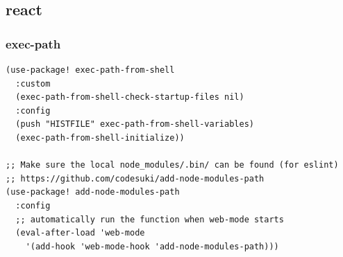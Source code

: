 \documentclass[11pt]{article}
\begin{document}
\subsection{react}
\label{sec:org29caf84}
\subsubsection{exec-path}
\label{sec:orgfc506ff}
\begin{verbatim}
(use-package! exec-path-from-shell
  :custom
  (exec-path-from-shell-check-startup-files nil)
  :config
  (push "HISTFILE" exec-path-from-shell-variables)
  (exec-path-from-shell-initialize))

;; Make sure the local node_modules/.bin/ can be found (for eslint)
;; https://github.com/codesuki/add-node-modules-path
(use-package! add-node-modules-path
  :config
  ;; automatically run the function when web-mode starts
  (eval-after-load 'web-mode
    '(add-hook 'web-mode-hook 'add-node-modules-path)))
\end{verbatim}
\end{document}
